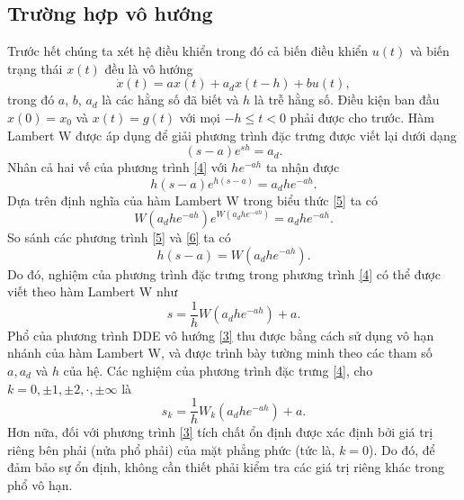 \subsection{Trường hợp vô hướng}
\noindent Trước hết chúng ta xét hệ điều khiển trong đó cả biến điều khiển $u(t)$ và biến trạng thái $x(t)$ đều là vô hướng
%
\begin{equation}\label{3}
\dot{x}(t)=ax(t)+a_dx(t-h)+bu(t),
\end{equation} 
%
trong đó $a$, $b$, $a_d$ là các hằng số đã biết và $h$ là trễ hằng số. Điều kiện ban đầu $x(0)=x_0$ và $x(t)=g(t)$ với mọi $-h\leq t<0$ phải được cho trước. Hàm Lambert W được áp dụng để giải phương trình đặc trưng được viết lại dưới dạng
\begin{equation}\label{4}
(s-a)e^{sh}=a_d.
\end{equation} 
Nhân cả hai vế của phương trình \eqref{4} với $he^{-ah}$ ta nhận được
\begin{equation}\label{5}
h(s-a)e^{h(s-a)}=a_dhe^{-ah}.
\end{equation}
Dựa trên định nghĩa của hàm Lambert W trong biểu thức \eqref{5} ta có
\begin{equation}\label{6}
W(a_dhe^{-ah})e^{W(a_dhe^{-ah})}=a_dhe^{-ah}.
\end{equation} 
So sánh các phương trình \eqref{5} và \eqref{6} ta có
\begin{equation}\label{7}
h(s-a)=W(a_dhe^{-ah}).
\end{equation} 
Do đó, nghiệm của phương trình đặc trưng trong phương trình \eqref{4} có thể được viết theo hàm Lambert W như
\begin{equation}\label{8}
s=\dfrac{1}{h}W(a_dhe^{-ah})+a.
\end{equation} 
Phổ của phương trình DDE vô hướng \eqref{3} thu được bằng cách sử dụng vô hạn nhánh của hàm Lambert W, và được trình bày tường minh theo các tham số $a, a_d$ và $h$ của hệ. Các nghiệm của phương trình đặc trưng \eqref{4}, cho $k=0,\pm 1,\pm 2,\cdot, \pm\infty$ là
\begin{equation}\label{9}
s_k=\dfrac{1}{h}W_k(a_dhe^{-ah})+a.
\end{equation}
Hơn nữa, đối với phương trình \eqref{3} tích chất ổn định được xác định bởi giá trị riêng bên phải (nửa phổ phải) của mặt phẳng phức (tức là, $k = 0$). Do đó, để đảm bảo sự ổn định, không cần thiết phải kiểm tra các giá trị riêng khác trong phổ vô hạn.

